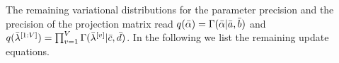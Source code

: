 
The remaining variational distributions for the parameter precision and the precision of the projection matrix read 
$q(\bar{\alpha} ) = \Gamma(\bar{\alpha}  | \bar{a} , \bar{b})$ and $q(\bar{\lambda}^{[1:V]}) = \prod_{v=1}^V \Gamma(\bar{\lambda}^{[v]} | \bar{c} , \bar{d})$.
In the following we list the remaining update equations.
%
